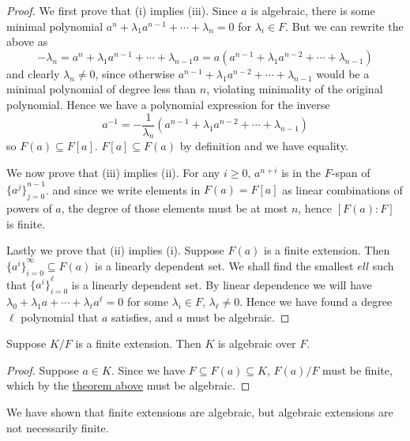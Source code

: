 \begin{proof}
    We first prove that (i) implies (iii).
    Since \(a\) is algebraic, there is some minimal polynomial
    \(a^n + \lambda_1 a^{n-1} + \cdots + \lambda_n = 0\) for \(\lambda_i \in F\).
    But we can rewrite the above as
    \begin{equation*}
        -\lambda_n = a^n + \lambda_1 a^{n-1} + \cdots + \lambda_{n-1}a
        = a(a^{n-1} + \lambda_1 a^{n-2} + \cdots + \lambda_{n-1})
    \end{equation*}
    and clearly \(\lambda_n \neq 0\),
    since otherwise \(a^{n-1} + \lambda_1 a^{n-2} + \cdots + \lambda_{n-1}\)
    would be a minimal polynomial of degree less than \(n\),
    violating minimality of the original polynomial.
    Hence we have a polynomial expression for the inverse
    \begin{equation*}
        a^{-1} = -\frac{1}{\lambda_n}
        (a^{n-1} + \lambda_1 a^{n-2} + \cdots + \lambda_{n-1})
    \end{equation*}
    so \(F(a) \subseteq F[a]\).
    \(F[a] \subseteq F(a)\) by definition
    and we have equality.
    
    We now prove that (iii) implies (ii).
    For any \(i \geq 0\), \(a^{n+i}\) is in the \(F\)-span of \({\{a^j\}}_{j=0}^{n-1}\).
    and since we write elements in \(F(a) = F[a]\)
    as linear combinations of powers of \(a\),
    the degree of those elements must be at most \(n\),
    hence \([F(a):F]\) is finite.

    Lastly we prove that (ii) implies (i).
    Suppose \(F(a)\) is a finite extension.
    Then \({\{a^i\}}_{i=0}^\infty \subseteq F(a)\) is a linearly dependent set.
    We shall find the smallest \(ell\) such that
    \({\{a^i\}}_{i=0}^\ell\) is a linearly dependent set.
    By linear dependence we will have
    \(\lambda_0 + \lambda_1 a + \cdots + \lambda_\ell a^\ell = 0\)
    for some \(\lambda_i \in F\), \(\lambda_\ell \neq 0\).
    Hence we have found a degree \(\ell\) polynomial that \(a\) satisfies,
    and \(a\) must be algebraic.
\end{proof}
\begin{corollary}\label{cor:algebraic-finite-extension}
    Suppose \(K/F\) is a finite extension.
    Then \(K\) is algebraic over \(F\).
\end{corollary}
\begin{proof}
    Suppose \(a \in K\).
    Since we have \(F \subseteq F(a) \subseteq K\),
    \(F(a)/F\) must be finite,
    which by the \hyperref[thm:algebraic-finite-extension]{theorem above}
    must be algebraic.
\end{proof}
\begin{remark}
    We have shown that finite extensions are algebraic,
    but algebraic extensions are not necessarily finite.
\end{remark}

